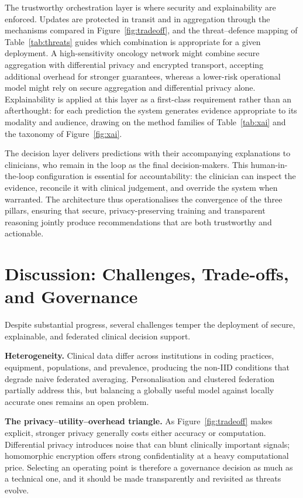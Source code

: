 \documentclass[11pt,a4paper]{article}
\begin{document}
The trustworthy orchestration layer is where security and explainability are
enforced. Updates are protected in transit and in aggregation through the
mechanisms compared in Figure~\ref{fig:tradeoff}, and the threat--defence mapping
of Table~\ref{tab:threats} guides which combination is appropriate for a given
deployment. A high-sensitivity oncology network might combine secure aggregation
with differential privacy and encrypted transport, accepting additional overhead
for stronger guarantees, whereas a lower-risk operational model might rely on
secure aggregation and differential privacy alone. Explainability is applied at
this layer as a first-class requirement rather than an afterthought: for each
prediction the system generates evidence appropriate to its modality and
audience, drawing on the method families of Table~\ref{tab:xai} and the taxonomy
of Figure~\ref{fig:xai}.

The decision layer delivers predictions with their accompanying explanations to
clinicians, who remain in the loop as the final decision-makers. This
human-in-the-loop configuration is essential for accountability: the clinician
can inspect the evidence, reconcile it with clinical judgement, and override the
system when warranted. The architecture thus operationalises the convergence of
the three pillars, ensuring that secure, privacy-preserving training and
transparent reasoning jointly produce recommendations that are both trustworthy
and actionable.

\section{Discussion: Challenges, Trade-offs, and Governance}
Despite substantial progress, several challenges temper the deployment of
secure, explainable, and federated clinical decision support.

\textbf{Heterogeneity.} Clinical data differ across institutions in coding
practices, equipment, populations, and prevalence, producing the non-IID
conditions that degrade naive federated averaging. Personalisation and clustered
federation partially address this, but balancing a globally useful model against
locally accurate ones remains an open problem.

\textbf{The privacy--utility--overhead triangle.} As Figure~\ref{fig:tradeoff}
makes explicit, stronger privacy generally costs either accuracy or computation.
Differential privacy introduces noise that can blunt clinically important
signals; homomorphic encryption offers strong confidentiality at a heavy
computational price. Selecting an operating point is therefore a governance
decision as much as a technical one, and it should be made transparently and
revisited as threats evolve.
\end{document}
